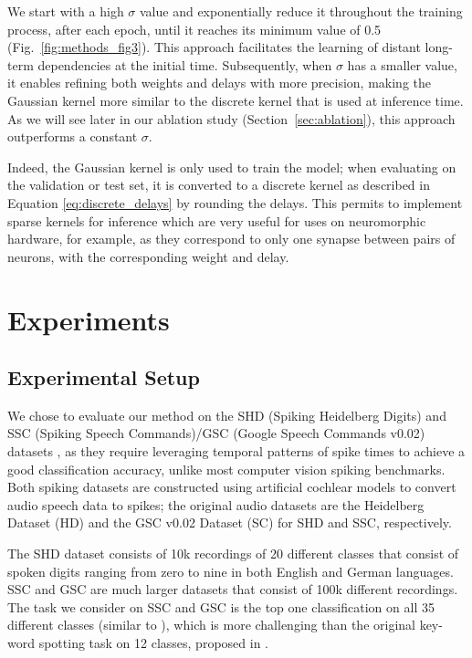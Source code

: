 \documentclass{article} \usepackage{iclr2024_conference,times}
\begin{document}
We start with a high $\sigma$ value and exponentially reduce it throughout the training process, after each epoch, until it reaches its minimum value of 0.5 (Fig.~\ref{fig:methods_fig3}). This approach facilitates the learning of distant long-term dependencies at the initial time. Subsequently, when $\sigma$ has a smaller value, it enables refining both weights and delays with more precision, making the Gaussian kernel more similar to the discrete kernel that is used at inference time. As we will see later in our ablation study (Section~\ref{sec:ablation}), this approach outperforms a constant $\sigma$.

Indeed, the Gaussian kernel is only used to train the model; when evaluating on the validation or test set, it is converted to a discrete kernel as described in Equation \ref{eq:discrete_delays} by rounding the delays. This permits to implement sparse kernels for inference which are very useful for uses on neuromorphic hardware, for example, as they correspond to only one synapse between pairs of neurons, with the corresponding weight and delay.












\section{Experiments}

\subsection{Experimental Setup}



We chose to evaluate our method on the SHD (Spiking Heidelberg Digits) and SSC (Spiking Speech Commands)/GSC (Google Speech Commands v0.02) datasets \citep{shd}, as they require leveraging temporal patterns of spike times to achieve a good classification accuracy, unlike most computer vision spiking benchmarks. Both spiking datasets are constructed using artificial cochlear models to convert audio speech data to spikes; the original audio datasets are the Heidelberg Dataset (HD) and the GSC v0.02 Dataset (SC) \citep{SC} for SHD and SSC, respectively. 

The SHD dataset consists of 10k recordings of 20 different classes that consist of spoken digits ranging from zero to nine in both English and German languages. SSC and GSC are much larger datasets that consist of 100k different recordings. The task we consider on SSC and GSC is the top one classification on all 35 different classes (similar to \citet{shd, baseline}), which is more challenging than the original key-word spotting task on 12 classes, proposed in \citet{SC}.
\end{document}
